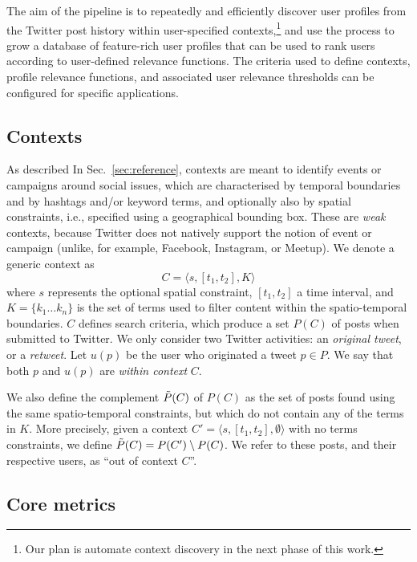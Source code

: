 \documentclass[runningheads]{llncs}
\begin{document}
The aim of the pipeline is to repeatedly and efficiently discover user profiles from the Twitter post history within user-specified contexts,\footnote{Our plan is automate context discovery in the next phase of this work.} and use the process to grow a database of feature-rich user profiles that can be used to rank users according to user-defined relevance functions. 
The criteria used to define contexts, profile relevance functions, and associated user relevance thresholds can be configured for specific applications.

\subsection{Contexts} \label{sec:contexts}

As described In Sec.~\ref{sec:reference}, contexts are meant to identify events or campaigns around social issues, which are characterised by temporal boundaries and by hashtags and/or keyword terms, and optionally also by spatial constraints, i.e., specified using a geographical bounding box.
These are \textit{weak} contexts, because Twitter does not natively support the notion of event or campaign (unlike, for example, Facebook, Instagram, or Meetup).
We denote a generic context as
\begin{equation}
C = \langle s, [t_1, t_2], K \rangle 
\label{eq:context}
\end{equation}
where $s$ represents the optional spatial constraint, $[t_1, t_2]$ a time interval, and $K = \{ k_1 \dots k_n\}$ is the set of terms used to filter content within the spatio-temporal boundaries.
%
$C$ defines search criteria, which produce a set $P(C)$ of posts when submitted to Twitter.
We only consider two Twitter activities: an \textit{original tweet}, or a \textit{retweet}.
Let $u(p)$ be the user who originated a tweet $p \in P$.
We say that both $p$ and $u(p)$ are \textit{within context} $C$.

We also define the complement $\Tilde{P}(C)$ of $P(C)$ as the set of posts found using the same spatio-temporal constraints, but which do not contain any of the terms in $K$. More precisely, given a context $C'= \langle s, [t_1, t_2], \emptyset \rangle$ with no terms constraints, we define $\Tilde{P}(C) = P(C') \setminus P(C)$. 
We refer to these posts, and their respective users, as ``out of context $C$''.

\subsection{Core metrics}
\end{document}
